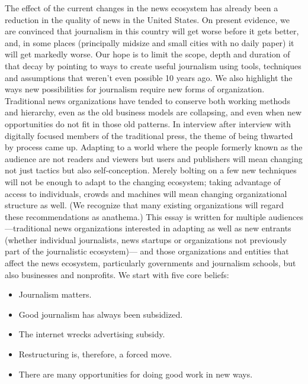The effect of the current changes in the news ecosystem has already been a
reduction in the quality of news in the United States. On present evidence, we
are convinced that journalism in this country will get worse before it gets better,
and, in some places (principally midsize and small cities with no daily paper) it
will get markedly worse. Our hope is to limit the scope, depth and duration of
that decay by pointing to ways to create useful journalism using tools, techniques
and assumptions that weren’t even possible 10 years ago.
We also highlight the ways new possibilities for journalism require new forms of
organization. Traditional news organizations have tended to conserve both working
methods and hierarchy, even as the old business models are collapsing, and
even when new opportunities do not fit in those old patterns. In interview after
interview with digitally focused members of the traditional press, the theme of
being thwarted by process came up. Adapting to a world where the people formerly
known as the audience are not readers and viewers but users and publishers
will mean changing not just tactics but also self-conception. Merely bolting
on a few new techniques will not be enough to adapt to the changing ecosystem;
taking advantage of access to individuals, crowds and machines will mean changing
organizational structure as well. (We recognize that many existing organizations
will regard these recommendations as anathema.)
This essay is written for multiple audiences—traditional news organizations
interested in adapting as well as new entrants (whether individual journalists,
news startups or organizations not previously part of the journalistic ecosystem)—
and those organizations and entities that affect the news ecosystem, particularly
governments and journalism schools, but also businesses and nonprofits.
We start with five core beliefs:
\begin{itemize}
\item Journalism matters.
\item Good journalism has always been subsidized.
\item The internet wrecks advertising subsidy.
\item Restructuring is, therefore, a forced move.
\item There are many opportunities for doing good work in new ways.
\end{itemize}

